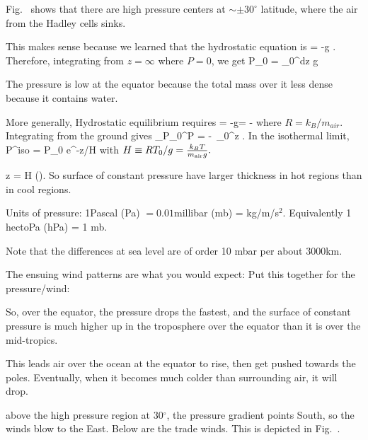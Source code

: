 \documentclass[11pt]{book}
\begin{document}
\bei
\item
Fig.~ shows that there are high pressure centers at $\sim\pm30^\circ$ latitude, where the air from the Hadley cells sinks. 
\item This makes sense because we learned that the hydrostatic equation is
\be
{} = -\rho g
.\ee
Therefore, integrating from $z=\infty$ where $P=0$, we get
\be
P_0 = \int_0^\infty dz \rho g
\ee
\item The pressure is low at the equator because the total mass over it less dense because it contains water. 
\item More generally, Hydrostatic equilibrium requires
\be
{} = -g\rho = -
\ee
where $R=k_B/m_{air}$. 
%
Integrating from the ground gives
\be
\int_{P_0}^P = -\, \int_0^z .\ee
In the isothermal limit,
\be
P^{iso} = P_0 e^{-z/H}\ee
with $H\equiv RT_0/g=\frac{k_BT}{m_{\rm air}g}.$ 
\item \be
\Delta z = H \ln\left(\right).\ee
So surface of constant pressure have larger thickness in hot regions than in cool regions.
\item Units of pressure: 1Pascal (Pa) $=0.01$millibar (mb) = kg/m/s$^2$. Equivalently 1 hectoPa  (hPa) = 1 mb.
\item Note that the differences at sea level are of order 10 mbar per about 3000km.
\eei

The ensuing wind patterns are what you would expect: 
Put this together for the pressure/wind:
\bei
\item So, over the equator, the pressure drops the fastest, and the surface of constant pressure is much higher up in the troposphere over the equator than it is over the mid-tropics.
\item This leads air over the ocean at the equator to rise, then get pushed towards the poles. Eventually, when it becomes much colder than surrounding air, it will drop.
\item above the high pressure region at 30$^\circ$, the pressure gradient points South, so the winds blow to the East. Below are the trade winds. This is depicted in Fig.~.
\eei
\end{document}
